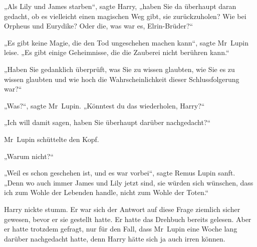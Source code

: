 „Als Lily und James starben“, sagte Harry, „haben Sie da überhaupt daran gedacht, ob es vielleicht einen magischen Weg gibt, sie zurückzuholen? Wie bei Orpheus und Eurydike? Oder die, was war es, Elrin-Brüder?“

„Es gibt keine Magie, die den Tod ungeschehen machen kann“, sagte Mr~Lupin leise. „Es gibt einige Geheimnisse, die die Zauberei nicht berühren kann.“

„Haben Sie gedanklich überprüft, was Sie zu wissen glaubten, wie Sie es zu wissen glaubten und wie hoch die Wahrscheinlichkeit dieser Schlussfolgerung war?“

„Was?“, sagte Mr~Lupin. „Könntest du das wiederholen, Harry?“

„Ich will damit sagen, haben Sie überhaupt darüber nachgedacht?“

Mr~Lupin schüttelte den Kopf.

„Warum nicht?“

„Weil es schon geschehen ist, und es war vorbei“, sagte Remus Lupin sanft. „Denn wo auch immer James und Lily jetzt sind, sie würden sich wünschen, dass ich zum Wohle der Lebenden handle, nicht zum Wohle der Toten.“

Harry nickte stumm. Er war sich der Antwort auf diese Frage ziemlich sicher gewesen, bevor er sie gestellt hatte. Er hatte das Drehbuch bereits gelesen. Aber er hatte trotzdem gefragt, nur für den Fall, dass Mr~Lupin eine Woche lang darüber nachgedacht hatte, denn Harry hätte sich ja auch irren können.

